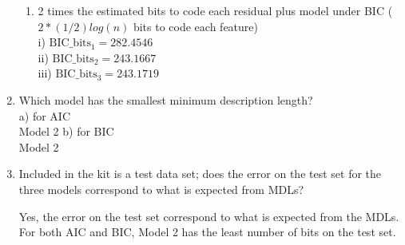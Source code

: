 \documentclass[english]{article}
\begin{document}
\begin{enumerate}
\begin{enumerate}
\item 2 times the estimated bits to code each residual plus model under BIC  ($2*(1/2) log(n)$ bits to code each feature) \\
i)   $\text{BIC}\_\text{bits}_1 = 282.4546$ \\
ii)  $\text{BIC}\_\text{bits}_2 = 243.1667$ \\
iii) $\text{BIC}\_\text{bits}_3 = 243.1719$ \\

\end{enumerate}

\item Which model has the smallest minimum description length? \\
a) for AIC \\
Model 2
b) for BIC\\
Model 2

\item  Included in the kit is a test data set; does the error on the test set for the three models
   correspond to what is expected from MDLs? 
   
   Yes, the error on the test set correspond to what is expected from the MDLs. For both AIC and BIC, Model 2 has the least number of bits on the test set.

\end{enumerate}
\end{document}
